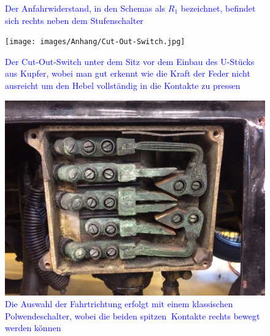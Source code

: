 \begin{landscape}
\begin{figure}[h]
	\caption{\textcolor{blue}{Der Anfahrwiderstand, in den Schemas als $R_1$ bezeichnet, befindet sich rechts neben dem Stufenschalter}}
	\label{fig:Anfahrwiderstand}
\end{figure}
\begin{figure}[h]
	\centering
		\texttt{[image: images/Anhang/Cut-Out-Switch.jpg]}
	\caption{\textcolor{blue}{Der Cut-Out-Switch unter dem Sitz vor dem Einbau des U-Stücks aus Kupfer, wobei man gut erkennt wie die Kraft der Feder nicht ausreicht um den Hebel vollständig in die Kontakte zu pressen}}
	\label{fig:Cut-Out-Switch}
\end{figure}
\begin{figure}[h]
	\centering
		\includegraphics[width=1.30\textwidth]{images/Anhang/Fahrtrichtung.jpg}
	\caption{\textcolor{blue}{Die Auswahl der Fahrtrichtung erfolgt mit einem klassischen Polwendeschalter, wobei die beiden \grqq spitzen\grqq$~$ Kontakte rechts bewegt werden können}}
	\label{fig:Fahrtrichtung}
\end{figure}
\begin{figure}[h]
	\centering

\end{figure}
\end{landscape}
